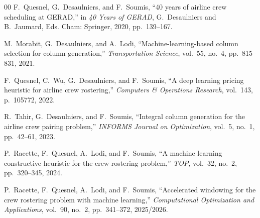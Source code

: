 \documentclass[journal]{IEEEtran}
\begin{document}
\begin{thebibliography}{00}
F.~Quesnel, G.~Desaulniers, and F.~Soumis, ``40 years of airline crew scheduling at GERAD,'' in \emph{40 Years of GERAD}, G.~Desaulniers and B.~Jaumard, Eds. Cham: Springer, 2020, pp.~139--167.

M.~Morabit, G.~Desaulniers, and A.~Lodi, ``Machine-learning-based column selection for column generation,'' \emph{Transportation Science}, vol.~55, no.~4, pp.~815--831, 2021.

F.~Quesnel, C.~Wu, G.~Desaulniers, and F.~Soumis, ``A deep learning pricing heuristic for airline crew rostering,'' \emph{Computers \& Operations Research}, vol.~143, p.~105772, 2022.

R.~Tahir, G.~Desaulniers, and F.~Soumis, ``Integral column generation for the airline crew pairing problem,'' \emph{INFORMS Journal on Optimization}, vol.~5, no.~1, pp.~42--61, 2023.

P.~Racette, F.~Quesnel, A.~Lodi, and F.~Soumis, ``A machine learning constructive heuristic for the crew rostering problem,'' \emph{TOP}, vol.~32, no.~2, pp.~320--345, 2024.

P.~Racette, F.~Quesnel, A.~Lodi, and F.~Soumis, ``Accelerated windowing for the crew rostering problem with machine learning,'' \emph{Computational Optimization and Applications}, vol.~90, no.~2, pp.~341--372, 2025/2026.

\end{thebibliography}
\end{document}
